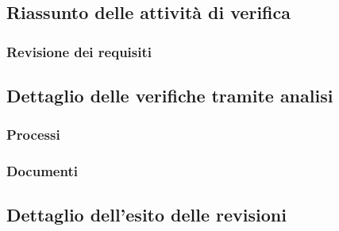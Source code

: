 \subsection{Riassunto delle attività di verifica}
\subsubsection{Revisione dei requisiti}
\subsection{Dettaglio delle verifiche tramite analisi}
\subsubsection{Processi}
\subsubsection{Documenti}
\subsection{Dettaglio dell’esito delle revisioni}
\pagebreak